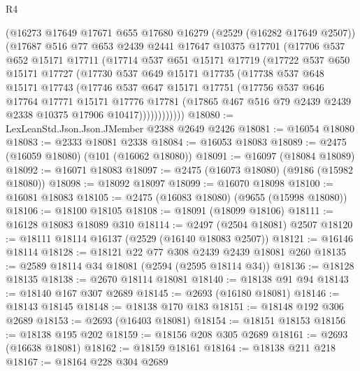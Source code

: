 \begin{lexlean}{R4}
\begin{coremodule}
        (@16273
          @17649
          @17671
          @655
          @17680
          @16279
          (@2529 (@16282 @17649 @2507))
          (@17687
            @516
            @77
            @653
            @2439
            @2441
            @17647
            @10375
            @17701
            (@17706
              @537
              @652
              @15171
              @17711
              (@17714
                @537
                @651
                @15171
                @17719
                (@17722
                  @537
                  @650
                  @15171
                  @17727
                  (@17730
                    @537
                    @649
                    @15171
                    @17735
                    (@17738
                      @537
                      @648
                      @15171
                      @17743
                      (@17746
                        @537
                        @647
                        @15171
                        @17751
                        (@17756
                          @537
                          @646
                          @17764
                          @17771
                          @15171
                          @17776
                          @17781
                          (@17865 @467 @516 @79 @2439 @2439 @2338 @10375 @17906 @10417))))))))))))
@18080 := LexLeanStd.Json.Json.JMember @2388 @2649 @2426
@18081 := @16054 @18080
@18083 := @2333 @18081 @2338
@18084 := @16053 @18083
@18089 := @2475 (@16059 @18080) (@101 (@16062 @18080))
@18091 := @16097 (@18084 @18089)
@18092 := @16071 @18083
@18097 := @2475 (@16073 @18080) (@9186 (@15982 @18080))
@18098 := @18092 @18097
@18099 := @16070 @18098
@18100 := @16081 @18083
@18105 := @2475 (@16083 @18080) (@9655 (@15998 @18080))
@18106 := @18100 @18105
@18108 := @18091 (@18099 @18106)
@18111 := @16128 @18083 @18089 @310
@18114 := @2497 (@2504 @18081) @2507
@18120 := @18111 @18114 @16137 (@2529 (@16140 @18083 @2507))
@18121 := @16146 @18114
@18128 := @18121 @22 @77 @308 @2439 @2439 @18081 @260
@18135 := @2589 @18114 @34 @18081 (@2594 (@2595 @18114 @34))
@18136 := @18128 @18135
@18138 := @2670 @18114 @18081
@18140 := @18138 @91 @94
@18143 := @18140 @167 @307 @2689
@18145 := @2693 (@16180 @18081)
@18146 := @18143 @18145
@18148 := @18138 @170 @183
@18151 := @18148 @192 @306 @2689
@18153 := @2693 (@16403 @18081)
@18154 := @18151 @18153
@18156 := @18138 @195 @202
@18159 := @18156 @208 @305 @2689
@18161 := @2693 (@16638 @18081)
@18162 := @18159 @18161
@18164 := @18138 @211 @218
@18167 := @18164 @228 @304 @2689

\end{coremodule}
\end{lexlean}
